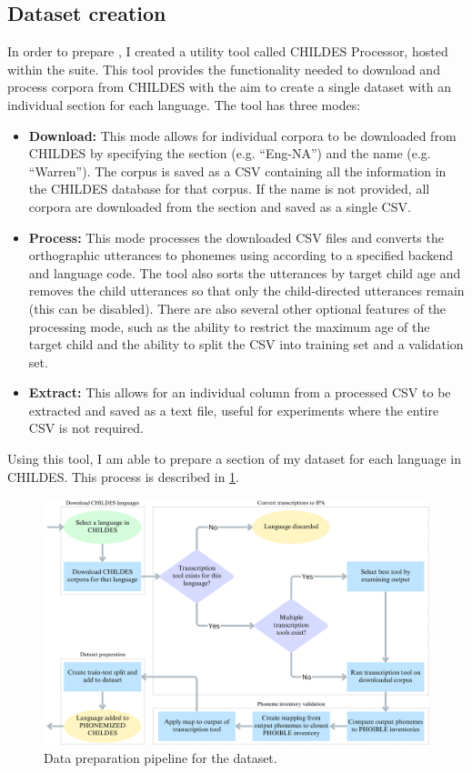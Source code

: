 \subsection{Dataset creation}
\label{sec:dataset-phonemized-childes-creation}

In order to prepare \ipachildes, I created a utility tool called CHILDES Processor, hosted within the \corpusphonemizer suite. This tool provides the functionality needed to download and process corpora from CHILDES with the aim to create a single dataset with an individual section for each language. The tool has three modes:
\begin{itemize}
\item \textbf{Download:} This mode allows for individual corpora to be downloaded from CHILDES by specifying the section (e.g. ``Eng-NA'') and the name (e.g. ``Warren''). The corpus is saved as a CSV containing all the information in the CHILDES database for that corpus. If the name is not provided, all corpora are downloaded from the section and saved as a single CSV.
\item\textbf{Process:} This mode processes the downloaded CSV files and converts the orthographic utterances to phonemes using \corpusphonemizer according to a specified backend and language code. The tool also sorts the utterances by target child age and removes the child utterances so that only the child-directed utterances remain (this can be disabled). There are also several other optional features of the processing mode, such as the ability to restrict the maximum age of the target child and the ability to split the CSV into training set and a validation set.
\item\textbf{Extract:} This allows for an individual column from a processed CSV to be extracted and saved as a text file, useful for experiments where the entire CSV is not required.
\end{itemize}

Using this tool, I am able to prepare a section of my dataset for each language in CHILDES. This process is described in \cref{fig:dataset-phonemized-childes-prep}.

\begin{figure}[ht]
    \centering
    \includegraphics[width=0.9\linewidth]{Figures/13Dataset/data-prep.png}
    \caption{Data preparation pipeline for the \ipachildes dataset.}
    \label{fig:dataset-phonemized-childes-prep}
\end{figure}


